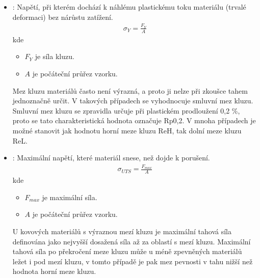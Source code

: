 \documentclass[letterpaper,10pt,english]{jupyterBook}
\begin{document}
\begin{itemize}
\item {} 
\sphinxAtStartPar
{}: Napětí, při kterém dochází k náhlému plastickému toku materiálu (trvalé deformaci) bez nárůstu zatížení.
\begin{equation*}
\begin{split}\sigma_Y = \frac{F_Y}{A}\end{split}
\end{equation*}
\sphinxAtStartPar
kde
\begin{itemize}
\item {} 
\sphinxAtStartPar
\(F_{Y}\) je síla kluzu.

\item {} 
\sphinxAtStartPar
\(A\) je počáteční průřez vzorku.

\end{itemize}

\sphinxAtStartPar
Mez kluzu materiálů často není výrazná, a proto ji nelze při zkoušce tahem jednoznačně určit. V takových případech se vyhodnocuje smluvní mez kluzu. Smluvní mez kluzu se zpravidla určuje při plastickém prodloužení 0,2 \%, proto se tato charakteristická hodnota označuje Rp0,2. V mnoha případech je možné stanovit jak hodnotu horní meze kluzu ReH, tak dolní meze kluzu ReL.

\noindent{}

\item {} 
\sphinxAtStartPar
{}: Maximální napětí, které materiál snese, než dojde k porušení.
\begin{equation*}
\begin{split}
    \sigma_{UTS} = \frac{F_{max}}{A}
    \end{split}
\end{equation*}
\sphinxAtStartPar
kde
\begin{itemize}
\item {} 
\sphinxAtStartPar
\(F_{max}\) je maximální síla.

\item {} 
\sphinxAtStartPar
\(A\) je počáteční průřez vzorku.

\end{itemize}

\sphinxAtStartPar
U kovových materiálů s výraznou mezí kluzu je maximální tahová síla definována jako nejvyšší dosažená síla až za oblastí s mezí kluzu. Maximální tahová síla po překročení meze kluzu může u méně zpevněných materiálů ležet i pod mezí kluzu, v tomto případě je pak mez pevnosti v tahu nižší než hodnota horní meze kluzu.

\end{itemize}
\end{document}
